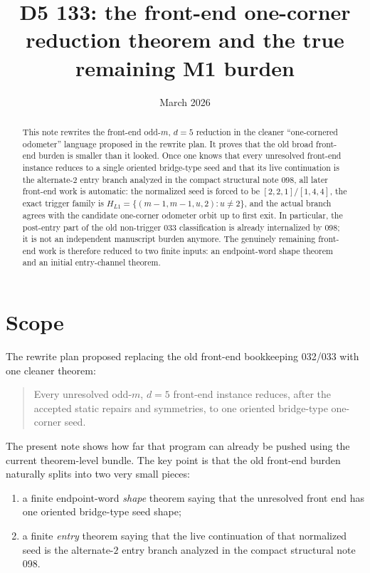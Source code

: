 \documentclass[11pt]{article}
\title{D5 133: the front-end one-corner reduction theorem and the true remaining M1 burden}
\author{}
\date{March 2026}
\begin{document}
\maketitle

\begin{abstract}
This note rewrites the front-end odd-$m$, $d=5$ reduction in the cleaner
``one-cornered odometer'' language proposed in the rewrite plan.
It proves that the old broad front-end burden is smaller than it looked.
Once one knows that every unresolved front-end instance reduces to a single
oriented bridge-type seed and that its live continuation is the alternate-$2$
entry branch analyzed in the compact structural note \textup{098}, all later
front-end work is automatic: the normalized seed is forced to be
\([2,2,1]/[1,4,4]\), the exact trigger family is
\(H_{L1}=\{(m-1,m-1,u,2):u\neq 2\}\), and the actual branch agrees with the
candidate one-corner odometer orbit up to first exit.
In particular, the post-entry part of the old non-trigger \textup{033}
classification is already internalized by \textup{098}; it is not an
independent manuscript burden anymore.
The genuinely remaining front-end work is therefore reduced to two finite
inputs: an endpoint-word shape theorem and an initial entry-channel theorem.
\end{abstract}

\section{Scope}

The rewrite plan proposed replacing the old front-end bookkeeping
\textup{032}/\textup{033} with one cleaner theorem:

\begin{quote}
Every unresolved odd-$m$, $d=5$ front-end instance reduces, after the accepted
static repairs and symmetries, to one oriented bridge-type one-corner seed.
\end{quote}

The present note shows how far that program can already be pushed using the
current theorem-level bundle.
The key point is that the old front-end burden naturally splits into two very
small pieces:
\begin{enumerate}[label=\textup{(\arabic*)},leftmargin=2.5em]
\item a finite endpoint-word \emph{shape} theorem saying that the unresolved
      front end has one oriented bridge-type seed shape;
\item a finite \emph{entry} theorem saying that the live continuation of that
      normalized seed is the alternate-$2$ entry branch analyzed in the compact
      structural note \textup{098}.
\end{enumerate}
\end{document}
